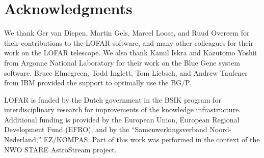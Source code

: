 \documentclass{sig-alternate}
\begin{document}
%
%


\section*{Acknowledgments}
We thank Ger van Diepen, Martin Gels, Marcel Loose, and Ruud Overeem
for their contributions to the LOFAR software, and many other colleagues
for their work on the LOFAR telescope.
We also thank Kamil Iskra and Kazutomo Yoshii from Argonne National Laboratory
for their work on the Blue Gene system software.
Bruce Elmegreen, Todd Inglett, Tom Liebsch, and Andrew Taufener from IBM
provided the support to optimally use the BG/P.

LOFAR is funded by the Dutch government in the BSIK program for
interdisciplinary research for improvements of the knowledge
infrastructure.  Additional funding is provided by the European Union,
European Regional Development Fund (EFRO), and by the
``Samenwerkingsverband Noord-Nederland,'' EZ/KOMPAS. Part of this work was
performed in the context of the NWO STARE AstroStream project.

\newpage



\end{document}
